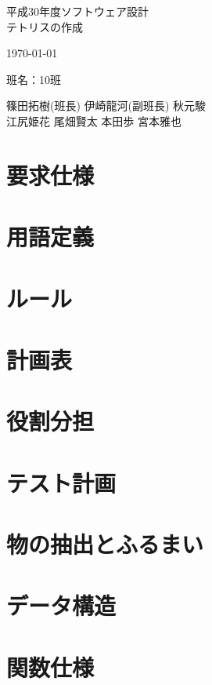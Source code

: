 \documentclass[11pt,a4paper,dvipdfmx]{jsarticle}
\begin{document}
  \begin{center}
    {\Large 平成30年度ソフトウェア設計\\ テトリスの作成}\par
    \vspace{15mm}
    {\today}\par
    \vspace{100mm}
    {\large 班名：10班}\par
    {\large 篠田拓樹(班長) 伊崎龍河(副班長) 秋元駿\\ 
    江尻姫花 尾畑賢太 本田歩 宮本雅也}
  \end{center}
  \thispagestyle{empty}
  \clearpage
  \addtocounter{page}{-1}
  \tableofcontents
  \clearpage
  \section{要求仕様}
    
  \section{用語定義}
    
  \section{ルール}
    
  \clearpage
  \section{計画表}
    
  \section{役割分担}
    
  \clearpage
  \section{テスト計画}
    
  \clearpage
  \section{物の抽出とふるまい}
    
  \section{データ構造}
    
  \clearpage
  \section{関数仕様}
    
  \clearpage
\end{document}
